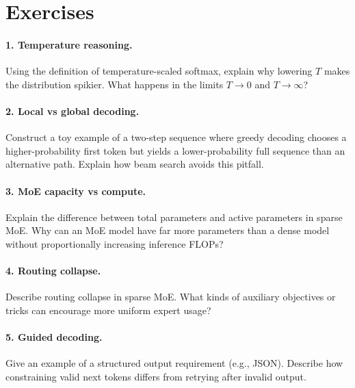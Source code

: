 \section{Exercises}
\paragraph{1. Temperature reasoning.}
Using the definition of temperature-scaled softmax, explain why lowering \(T\) makes the distribution spikier. What happens in the limits \(T\to 0\) and \(T\to \infty\)?

\paragraph{2. Local vs global decoding.}
Construct a toy example of a two-step sequence where greedy decoding chooses a higher-probability first token but yields a lower-probability full sequence than an alternative path. Explain how beam search avoids this pitfall.

\paragraph{3. MoE capacity vs compute.}
Explain the difference between total parameters and active parameters in sparse MoE. Why can an MoE model have far more parameters than a dense model without proportionally increasing inference FLOPs?

\paragraph{4. Routing collapse.}
Describe routing collapse in sparse MoE. What kinds of auxiliary objectives or tricks can encourage more uniform expert usage?

\paragraph{5. Guided decoding.}
Give an example of a structured output requirement (e.g., JSON). Describe how constraining valid next tokens differs from retrying after invalid output.
